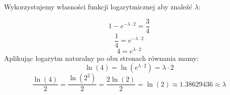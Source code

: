 \documentclass{article}
\begin{document}
Wykorzystujemy własności funkcji logarytmicznej aby znaleźć \(\lambda\):

\begin{equation*}
    1 - e^{- \lambda \cdot 2} = \frac{3}{4}
\end{equation*}
\begin{equation*}
    \frac{1}{4} = e^{- \lambda \cdot 2}
\end{equation*}
\begin{equation*}
    4 = e^{\lambda \cdot 2}
\end{equation*}
Aplikując logarytm naturalny po obu stronach równania mamy:
\begin{equation*}
    \ln(4) = \ln(e^{\lambda \cdot 2}) = \lambda \cdot 2
\end{equation*}
\begin{equation*}
    \frac{\ln(4)}{2} = \frac{\ln(2^2)}{2} = \frac{2 \ln(2)}{2} = \ln(2) \approx 1.38629436 \approx \lambda
\end{equation*}
\end{document}
